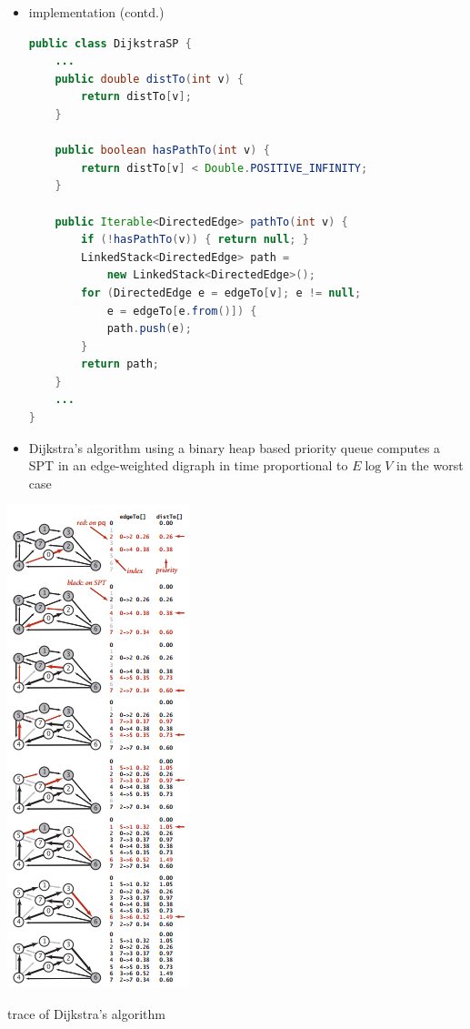\documentclass[8pt,a4paper,compress]{beamer}
\begin{document}
\begin{frame}[fragile]
\begin{minipage}{220pt}
\begin{itemize}
\item implementation (contd.)
\begin{lstlisting}[language=Java]
public class DijkstraSP {
    ...
    public double distTo(int v) { 
        return distTo[v]; 
    }

    public boolean hasPathTo(int v) { 
        return distTo[v] < Double.POSITIVE_INFINITY; 
    }
    
    public Iterable<DirectedEdge> pathTo(int v) {
        if (!hasPathTo(v)) { return null; }
        LinkedStack<DirectedEdge> path = 
            new LinkedStack<DirectedEdge>();
        for (DirectedEdge e = edgeTo[v]; e != null; 
            e = edgeTo[e.from()]) {
            path.push(e);
        }
        return path;
    }
    ...
}
\end{lstlisting}

\item Dijkstra's algorithm using a binary heap based priority queue computes a SPT in an edge-weighted digraph in time proportional to $E\log V$ in the worst case
\end{itemize}
\end{minipage}%
\begin{minipage}{80pt}
\begin{center}
\includegraphics[scale=0.42]{./figures/sp4.png}

\smallskip

\small trace of Dijkstra's algorithm
\end{center}
\end{minipage}
\end{frame}
\end{document}
